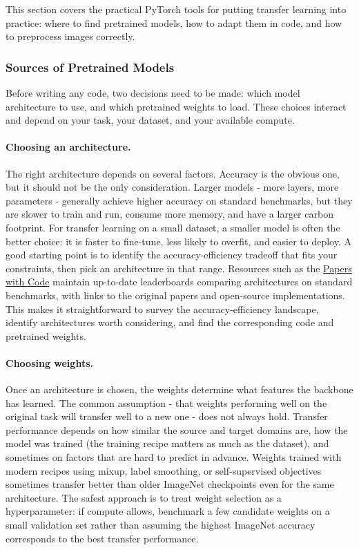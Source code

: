 This section covers the practical PyTorch tools for putting transfer learning into practice: where to find pretrained models, how to adapt them in code, and how to preprocess images correctly.

\subsubsection{Sources of Pretrained Models}

Before writing any code, two decisions need to be made: which model architecture to use, and which pretrained weights to load. These choices interact and depend on your task, your dataset, and your available compute.

\paragraph{Choosing an architecture.} The right architecture depends on several factors. Accuracy is the obvious one, but it should not be the only consideration. Larger models - more layers, more parameters - generally achieve higher accuracy on standard benchmarks, but they are slower to train and run, consume more memory, and have a larger carbon footprint. For transfer learning on a small dataset, a smaller model is often the better choice: it is faster to fine-tune, less likely to overfit, and easier to deploy. A good starting point is to identify the accuracy-efficiency tradeoff that fits your constraints, then pick an architecture in that range. Resources such as the \href{https://paperswithcode.com/}{Papers with Code} maintain up-to-date leaderboards comparing architectures on standard benchmarks, with links to the original papers and open-source implementations. This makes it straightforward to survey the accuracy-efficiency landscape, identify architectures worth considering, and find the corresponding code and pretrained weights.

\paragraph{Choosing weights.} Once an architecture is chosen, the weights determine what features the backbone has learned. The common assumption - that weights performing well on the original task will transfer well to a new one - does not always hold. Transfer performance depends on how similar the source and target domains are, how the model was trained (the training recipe matters as much as the dataset), and sometimes on factors that are hard to predict in advance. Weights trained with modern recipes using mixup, label smoothing, or self-supervised objectives sometimes transfer better than older ImageNet checkpoints even for the same architecture. The safest approach is to treat weight selection as a hyperparameter: if compute allows, benchmark a few candidate weights on a small validation set rather than assuming the highest ImageNet accuracy corresponds to the best transfer performance.

